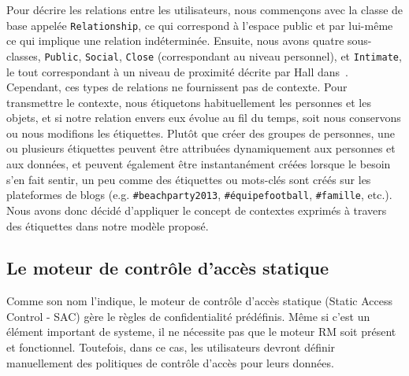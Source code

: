Pour décrire les relations entre les utilisateurs, nous commençons avec la classe de base appelée \verb+Relationship+, ce qui correspond à l'espace public et par lui-même ce qui implique une relation indéterminée. Ensuite, nous avons quatre sous-classes, \verb+Public+, \verb+Social+, \verb+Close+ (correspondant au niveau personnel), et \verb+Intimate+, le tout correspondant à un niveau de proximité décrite par Hall dans~\cite{edward1966hall}. Cependant, ces types de relations ne fournissent pas de contexte. Pour transmettre le contexte, nous étiquetons habituellement les personnes et les objets, et si notre relation envers eux évolue au fil du temps, soit nous conservons ou nous modifions les étiquettes. Plutôt que créer des groupes de personnes, une ou plusieurs étiquettes peuvent être attribuées dynamiquement aux personnes et aux données, et peuvent également être instantanément créées lorsque le besoin s'en fait sentir, un peu comme des étiquettes ou mots-clés sont créés sur les plateformes de blogs (e.g. \verb+#beachparty2013+, \verb+#équipefootball+, \verb+#famille+, etc.). Nous avons donc décidé d'appliquer le concept de contextes exprimés à travers des étiquettes dans notre modèle proposé.

\subsection*{Le moteur de contrôle d'accès statique}
Comme son nom l'indique, le moteur de contrôle d'accès statique (Static Access Control - SAC) gère le règles de confidentialité prédéfinis. Même si c'est un élément important de systeme, il ne nécessite pas que le moteur RM soit présent et fonctionnel. Toutefois, dans ce cas, les utilisateurs devront définir manuellement des politiques de contrôle d'accès pour leurs données.\\


